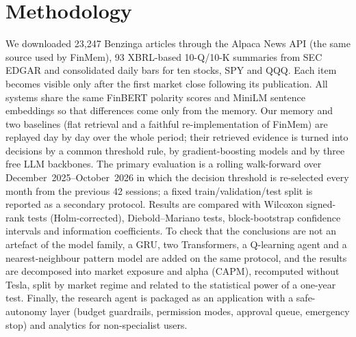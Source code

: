 \section{Methodology}
We downloaded 23{,}247 Benzinga articles through the Alpaca News API (the same source used by FinMem), 93 XBRL-based 10-Q/10-K summaries from SEC EDGAR and consolidated daily bars for ten stocks, SPY and QQQ. Each item becomes visible only after the first market close following its publication. All systems share the same FinBERT polarity scores and MiniLM sentence embeddings so that differences come only from the memory. Our memory and two baselines (flat retrieval and a faithful re-implementation of FinMem) are replayed day by day over the whole period; their retrieved evidence is turned into decisions by a common threshold rule, by gradient-boosting models and by three free LLM backbones. The primary evaluation is a rolling walk-forward over December~2025--October~2026 in which the decision threshold is re-selected every month from the previous 42 sessions; a fixed train/validation/test split is reported as a secondary protocol. Results are compared with Wilcoxon signed-rank tests (Holm-corrected), Diebold--Mariano tests, block-bootstrap confidence intervals and information coefficients. To check that the conclusions are not an artefact of the model family, a GRU, two Transformers, a Q-learning agent and a nearest-neighbour pattern model are added on the same protocol, and the results are decomposed into market exposure and alpha (CAPM), recomputed without Tesla, split by market regime and related to the statistical power of a one-year test. Finally, the research agent is packaged as an application with a safe-autonomy layer (budget guardrails, permission modes, approval queue, emergency stop) and analytics for non-specialist users.

